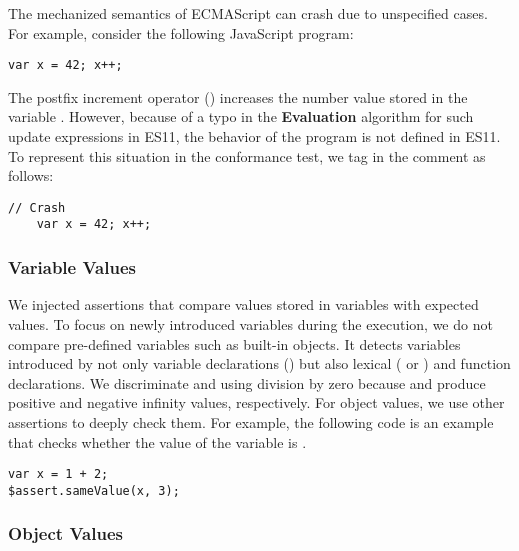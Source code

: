 The mechanized semantics of ECMAScript can crash due to unspecified cases.
For example, consider the following JavaScript program:
\begin{lstlisting}[style=myJSstyle]
    var x = 42; x++;
\end{lstlisting}
The postfix increment operator (\code{++}) increases the number value
stored in the variable .  However, because of a typo in the
\textbf{Evaluation} algorithm for such update expressions in ES11, the
behavior of the program is not defined in ES11.  To represent this situation in
the conformance test, we tag  in the comment as follows:
\begin{lstlisting}[style=myJSstyle]
    // Crash
    var x = 42; x++;
\end{lstlisting}


\subsubsection{Variable Values}

We injected assertions that compare values stored in variables with expected
values.  To focus on newly introduced variables during the execution, we do not
compare pre-defined variables such as built-in objects.  It detects variables
introduced by not only variable declarations () but also lexical
( or ) and function declarations.  We discriminate
 and  using division by zero because  and
 produce positive and negative infinity values, respectively.  For
object values, we use other assertions to deeply check them.  For example, the
following code is an example that checks whether the value of the variable
 is .
\begin{lstlisting}[style=myJSstyle]
var x = 1 + 2;
$assert.sameValue(x, 3);
\end{lstlisting}


\subsubsection{Object Values}

